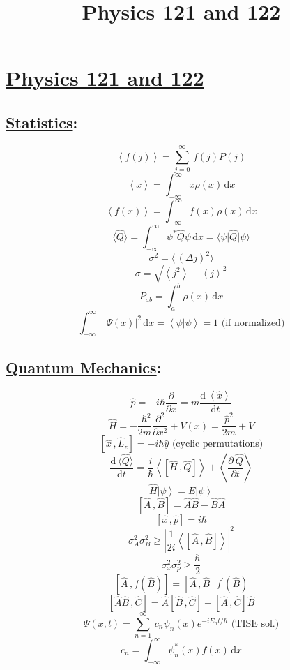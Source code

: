 \documentclass[fleqn]{article}
\title{\vspace{1mm}Physics 121 and 122}
\date{}
\begin{document}
\newcommand{\myint}[4]{\int_{#1}^{#2} \!  #3  \, \mathrm{d} #4}
\newcommand{\paren}[1]{\!\left({#1}\right)}
\newcommand{\commutator}[2]{\left[ #1\, , #2\right]}
\newcommand{\expec}[1]{\! \left\langle {#1}\right\rangle}
\newcommand{\expect}[1]{\! \langle {#1}\rangle}
\newcommand{\mysum}[3]{\sum_{#1}^{#2} \, #3 }
\newcommand{\pdiv}[3]{ \frac{\partial^{#3}\!{#1}}{\partial{#2}^{#3} } }
\newcommand{\deriv}[3]{ \frac{\mathrm{d}^{#3}\!{#1}}{\mathrm{d}{#2}^{#3} } }
\newcommand{\braket}[1]{\!\left| #1 \right\rangle}
\newcommand{\half}[0]{\frac{1}{2}}


\section*{\centering \underline{Physics 121 and 122}}
\begin{multicols*}{3}

\subsection*{ \centering \underline{Statistics}:}
\[ \expec{f\paren{j}} =  \mysum{j=0}{\infty}{f\paren{j}P\paren{j}}\]
\[\expec{x} = \myint{-\infty}{\infty}{x\rho\paren{x}\!}{x}\]
\[ \expec{f\paren{x}} = \myint{-\infty}{\infty}{f\paren{x}\!\rho\paren{x}\!}{x}\]
\[ \expect{\hat{Q}} = \myint{-\infty}{\infty}{\psi^{\ast}\hat{Q}\psi}{x} = \langle \psi \vert \hat{Q} \vert \psi \rangle \]
\[ \sigma^{2}  = \expect{\,\paren{\Delta j}^2} \]
\[\sigma = \sqrt{\expec{j^2} - \expec{j}^2}\]
\[P_{ab} = \myint{a}{b}{\rho\paren{x}\!}{x}\]
\[ \myint{-\infty}{\infty}{\left\vert \Psi\paren{x} \right\vert^2}{x} = \expec{\psi \vert \psi} = 1 \mbox{ (if normalized)}\]

\subsection*{ \centering \underline{Quantum Mechanics}:}
\[\hat{p} = -i\hbar\pdiv{}{x}{} =  m\deriv{\,\expec{\hat{x}}}{t}{}  \]
\[\hat{H} = -\frac{\,\,\hbar^2}{2m}\pdiv{}{x}{2} + V\paren{x} = \frac{\hat{p}^2}{2m} + V\]
\[ \commutator{\hat{x}}{\hat{L}_{z}} = -i\hbar \hat{y} \mbox{ (cyclic permutations)}\]
\[ \deriv{\,\expect{\hat{Q}}}{t}{} = \frac{i}{\hbar}\expec{\commutator{\hat{H}}{\hat{Q}}} + \expec{\pdiv{\,\hat{Q}}{t}{}}\]
\[\hat{H}\braket{\psi} = E\braket{\psi}\]
\[\commutator{\hat{A}}{\hat{B}} = \hat{A}\hat{B} - \hat{B}\hat{A}\]
\[\commutator{\hat{x}}{\hat{p}} = i\hbar\]
\[\sigma_{A}^{2}\sigma_{B}^{2} \geq \left| \frac{1}{2i} \expec{\commutator{\hat{A}}{\hat{B}}}\right|^2 \]
\[\sigma_{x}^{2}\sigma_{p}^{2} \geq \frac{\hbar}{2}\]
\[\commutator{\hat{A}}{f(\hat{B})} = \commutator{\hat{A}}{\hat{B}}\!f^\prime\!(\hat{B})\]
\[\commutator{\hat{A}\hat{B}}{\hat{C}} = \hat{A}\!\commutator{\hat{B}}{\hat{C}} + \commutator{\hat{A}}{\hat{C}}\!\hat{B}\]
\[\Psi\paren{x,t} = \mysum{n = 1}{\infty}{c_n\psi_n(x)e^{-i E_n t / \hbar}}\!\mbox{ (TISE sol.)}\]
\[c_n = \myint{-\infty}{\infty}{\psi_n^{\ast}\!(x)f(x)}{x} \]



\end{multicols*}
\end{document}
